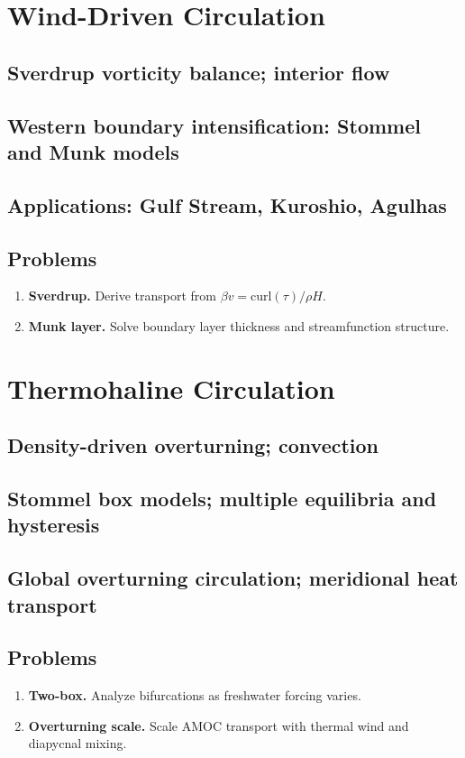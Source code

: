 \documentclass[12pt]{book}
\begin{document}
\chapter{Wind-Driven Circulation}
\section{Sverdrup vorticity balance; interior flow}
\section{Western boundary intensification: Stommel and Munk models}
\section{Applications: Gulf Stream, Kuroshio, Agulhas}
\section*{Problems}
\begin{enumerate}
  \item \textbf{Sverdrup.} Derive transport from $\beta v = \text{curl}(\tau)/\rho H$.
  \item \textbf{Munk layer.} Solve boundary layer thickness and streamfunction structure.
\end{enumerate}

\chapter{Thermohaline Circulation}
\section{Density-driven overturning; convection}
\section{Stommel box models; multiple equilibria and hysteresis}
\section{Global overturning circulation; meridional heat transport}
\section*{Problems}
\begin{enumerate}
  \item \textbf{Two-box.} Analyze bifurcations as freshwater forcing varies.
  \item \textbf{Overturning scale.} Scale AMOC transport with thermal wind and diapycnal mixing.
\end{enumerate}
\end{document}
